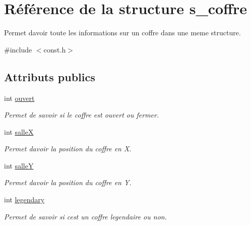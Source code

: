 \hypertarget{structs__coffre}{}\section{Référence de la structure s\+\_\+coffre}
\label{structs__coffre}


Permet d\textquotesingle{}avoir toute les informations sur un coffre dans une meme structure.  




{\ttfamily \#include $<$const.\+h$>$}

\subsection*{Attributs publics}
\begin{DoxyCompactItemize}
\item 
\mbox{\label{structs__coffre_afb82ada57004062b330e9a53de8dee90}} 
int \hyperlink{structs__coffre_afb82ada57004062b330e9a53de8dee90}{ouvert}
\begin{DoxyCompactList}\small\item\em Permet de savoir si le coffre est ouvert ou fermer. \end{DoxyCompactList}\item 
\mbox{\label{structs__coffre_a24df49ea4e8d4011c29a42502aec498f}} 
int \hyperlink{structs__coffre_a24df49ea4e8d4011c29a42502aec498f}{salleX}
\begin{DoxyCompactList}\small\item\em Permet d\textquotesingle{}avoir la position du coffre en X. \end{DoxyCompactList}\item 
\mbox{\label{structs__coffre_aac14aa9be56f087f8094bc93a1cd0612}} 
int \hyperlink{structs__coffre_aac14aa9be56f087f8094bc93a1cd0612}{salleY}
\begin{DoxyCompactList}\small\item\em Permet d\textquotesingle{}avoir la position du coffre en Y. \end{DoxyCompactList}\item 
\mbox{\label{structs__coffre_adedfa027141dbb432d2c37e702541e16}} 
int \hyperlink{structs__coffre_adedfa027141dbb432d2c37e702541e16}{legendary}
\begin{DoxyCompactList}\small\item\em Permet de savoir si c\textquotesingle{}est un coffre legendaire ou non. \end{DoxyCompactList}\end{DoxyCompactItemize}


